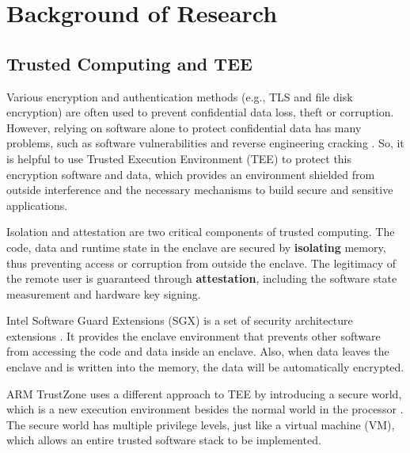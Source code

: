 \section{Background of Research}
\subsection{Trusted Computing and TEE}
Various encryption and authentication methods (e.g., TLS and file disk encryption)
are often used to prevent confidential data loss, theft or corruption.
However, relying on software alone to protect confidential data has many problems,
such as software vulnerabilities and reverse engineering cracking \cite{Zimba2021ARC}.
So, it is helpful to use Trusted Execution Environment (TEE) to protect this encryption
software and data, which provides an environment shielded from outside interference and
the necessary mechanisms to build secure and sensitive applications.

Isolation and attestation are two critical components of trusted computing.
The code, data and runtime state in the enclave are secured by \textbf{isolating} memory,
thus preventing access or corruption from outside the enclave.
The legitimacy of the remote user is guaranteed through \textbf{attestation},
including the software state measurement and hardware key signing.

Intel Software Guard Extensions (SGX) is a set of security architecture extensions
\cite{McKeen2013InnovativeIA}.
It provides the enclave environment that prevents other software from accessing
the code and data inside an enclave. Also, when data leaves the enclave and is written
into the memory, the data will be automatically encrypted.

ARM TrustZone uses a different approach to TEE by introducing a secure world,
which is a new execution environment besides the normal world in the processor
\cite{Mukhtar2019ArchitecturesFS}. The secure world has multiple privilege levels,
just like a virtual machine (VM), which allows an entire trusted software stack to
be implemented.


